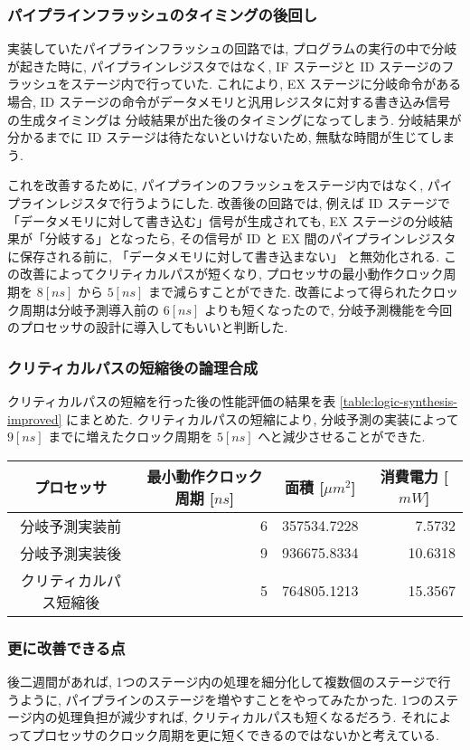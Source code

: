 \documentclass[../improvements.tex]{subfiles}
\begin{document}
  \subsubsection{パイプラインフラッシュのタイミングの後回し} \label{subsubsection:rethink-flush}
  実装していたパイプラインフラッシュの回路では, 
  プログラムの実行の中で分岐が起きた時に, 
  パイプラインレジスタではなく, IF ステージと ID ステージのフラッシュをステージ内で行っていた.
  これにより, EX ステージに分岐命令がある場合, 
  ID ステージの命令がデータメモリと汎用レジスタに対する書き込み信号の生成タイミングは
  分岐結果が出た後のタイミングになってしまう.
  分岐結果が分かるまでに ID ステージは待たないといけないため, 無駄な時間が生じてしまう.

  これを改善するために, パイプラインのフラッシュをステージ内ではなく, パイプラインレジスタで行うようにした.
  改善後の回路では, 例えば ID ステージで「データメモリに対して書き込む」信号が生成されても, 
  EX ステージの分岐結果が「分岐する」となったら, 
  その信号が ID と EX 間のパイプラインレジスタに保存される前に, 「データメモリに対して書き込まない」
  と無効化される.
  この改善によってクリティカルパスが短くなり, 
  プロセッサの最小動作クロック周期を $8[ns]$ から $5[ns]$ まで減らすことができた.
  改善によって得られたクロック周期は分岐予測導入前の $6[ns]$ よりも短くなったので, 
  分岐予測機能を今回のプロセッサの設計に導入してもいいと判断した.

  \subsubsection{クリティカルパスの短縮後の論理合成}
  クリティカルパスの短縮を行った後の性能評価の結果を表 \ref{table:logic-synthesis-improved} にまとめた.
  クリティカルパスの短縮により, 分岐予測の実装によって $9[ns]$ までに増えたクロック周期を
  $5[ns]$ へと減少させることができた.

  \begin{table*}[bp]
    \centering
    \begin{tabular}{|c|r|r|r|}
    \hline
    プロセッサ & \multicolumn{1}{c|}{最小動作クロック周期 {[}$ns${]}} & \multicolumn{1}{c|}{面積 {[}$\mu m^2${]}} & \multicolumn{1}{c|}{消費電力 {[}$mW${]}} \\ \hline
    分岐予測実装前 & 6 & 357534.7228 & 7.5732 \\
    分岐予測実装後 & 9 & 936675.8334 & 10.6318 \\
    クリティカルパス短縮後 & 5 & 764805.1213 & 15.3567 \\ \hline
    \end{tabular}
    \caption{性能改善前後の論理合成の結果}
    \label{table:logic-synthesis-improved}
  \end{table*}

  \subsubsection{更に改善できる点}
  後二週間があれば, 1つのステージ内の処理を細分化して複数個のステージで行うように, 
  パイプラインのステージを増やすことをやってみたかった.
  1つのステージ内の処理負担が減少すれば, クリティカルパスも短くなるだろう.
  それによってプロセッサのクロック周期を更に短くできるのではないかと考えている.
\end{document}
